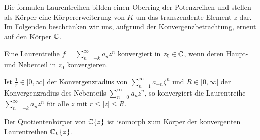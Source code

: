 %
Die formalen Laurentreihen bilden einen Oberring der Potenzreihen und stellen als Körper eine Körpererweiterung von $K$ um das transzendente Element $z$ dar.  %
%
%
%
%
% 
%
%
%
Im Folgenden beschränken wir uns, aufgrund der Konvergenzbetrachtung, erneut auf den Körper $\mathbb{C}$. 
%
\begin{defn}
Eine Laurentreihe $f = \sum_{n=-k}^\infty a_n z^n$  konvergiert in $z_0 \in \mathbb{C}$, wenn deren Haupt- und Nebenteil in $z_0$ konvergieren.
\end{defn}
%
%
\begin{bem}
Ist $\frac{1}{r} \in \lbrack 0,\infty\rbrack$ der Konvergenzradius von $\sum_{n=1}^{\infty} a_{-n}\zeta^n$ und $R\in \lbrack 0,\infty\rbrack$ der Konvergenzradius des Nebenteils $\sum_{n=0}^{\infty} a_{n}z^n$, so konvergiert die Laurentreihe $\sum_{n=-k}^\infty a_n z^n$ für alle $z$ mit $r \le |z| \le R$.
\end{bem} %
%
%
%
%
%
%
%
%
%
%
\begin{satz}
Der Quotientenkörper von  $\mathbb{C}\lbrace z\rbrace$ ist isomorph zum Körper der konvergenten Laurentreihen $\mathbb{C}_L \lbrace z \rbrace$.
\end{satz}
